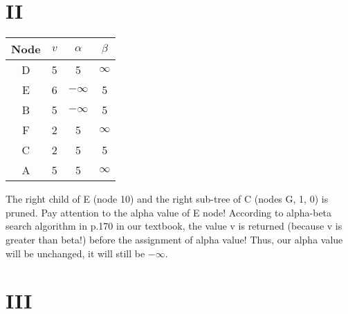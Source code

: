 \documentclass[12pt]{article}
\begin{document}
\section*{II}
\begin{table}[H]
\small
\centering
\label{table:example}
\begin{tabular}
{|c|c|c|c|}	%
\hline 							%
\textbf{Node} & \textbf{$v$} & \textbf{$\alpha$} & \textbf{$\beta$}\\
\hline
D & 5 & 5 & $\infty$ \\
E & 6 & $-\infty$ & 5 \\
B & 5 & $-\infty$ & 5 \\
F & 2 & 5 & $\infty$ \\
C & 2 & 5 & 5 \\
A & 5 & 5 & $\infty$ \\
\hline
\end{tabular}
\end{table}
The right child of E (node 10) and the right sub-tree of C (nodes G, 1, 0) is pruned. Pay attention to the alpha value of E node! According to alpha-beta search algorithm in p.170 in our textbook, the value v is returned (because v is greater than beta!) before the assignment of alpha value! Thus, our alpha value will be unchanged, it will still be $-\infty$.

\section*{III}
\end{document}

